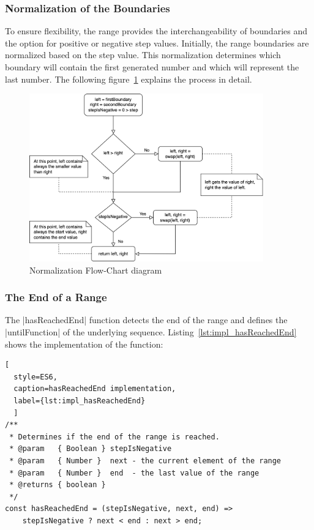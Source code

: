 \subsubsection{Normalization of the Boundaries}
\label{subsub:Normalization of the Boundaries}
To ensure flexibility, the range provides the interchangeability of boundaries
and the option for positive or negative step values. Initially, the range
boundaries are normalized based on the step value. This normalization
determines which boundary will contain the first generated number and which
will represent the last number.
The following figure~\ref{fig:norm-flowchart} explains the process in detail.

\begin{figure}[H]
    \centering
    \includegraphics[width=0.9\textwidth]{mainmatter/pictures/boundary-normalization.png}
    \caption{Normalization Flow-Chart diagram}
    \label{fig:norm-flowchart}
\end{figure}

\subsubsection{The End of a Range}
\label{subsub:The End of a Range}
The |hasReachedEnd| function detects the end of the range and defines the
|untilFunction| of the underlying sequence. Listing~\ref{lst:impl_hasReachedEnd}
shows the implementation of the function:

\begin{lstlisting}[
  style=ES6, 
  caption=hasReachedEnd implementation,
  label={lst:impl_hasReachedEnd}
  ]
/**
 * Determines if the end of the range is reached.
 * @param   { Boolean } stepIsNegative
 * @param   { Number }  next - the current element of the range
 * @param   { Number }  end  - the last value of the range
 * @returns { boolean }
 */
const hasReachedEnd = (stepIsNegative, next, end) =>
    stepIsNegative ? next < end : next > end;
\end{lstlisting}

